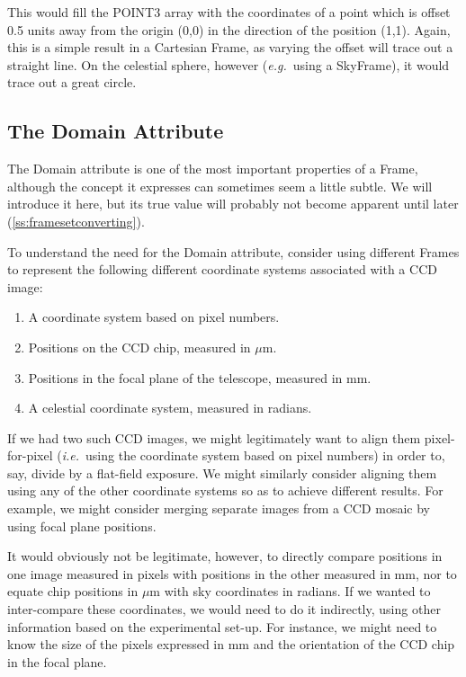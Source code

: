 \documentclass[twoside,11pt]{article}
\newcommand{\htmlref}[2]{#1}
\newcommand{\secref}[1]{\S\ref{#1}}
\renewcommand{\secref}[1]{\ref{#1}}
\begin{document}
This would fill the POINT3 array with the coordinates of a point which
is offset 0.5 units away from the origin (0,0) in the direction of the
position (1,1). Again, this is a simple result in a Cartesian Frame,
as varying the offset will trace out a straight line. On the celestial
sphere, however ({\em{e.g.}}\ using a SkyFrame), it would trace out a
great circle.

\subsection{\label{ss:framedomains}The Domain Attribute}

The \htmlref{Domain}{Domain} attribute is one of the most important properties of a
\htmlref{Frame}{Frame}, although the concept it expresses can sometimes seem a little
subtle.  We will introduce it here, but its true value will probably
not become apparent until later (\secref{ss:framesetconverting}).

To understand the need for the Domain attribute, consider using
different Frames to represent the following different coordinate
systems associated with a CCD image:

\begin{enumerate}
\item A coordinate system based on pixel numbers.

\item Positions on the CCD chip, measured in $\mu$m.

\item Positions in the focal plane of the telescope, measured in mm.

\item A celestial coordinate system, measured in radians.
\end{enumerate}

If we had two such CCD images, we might legitimately want to align
them pixel-for-pixel ({\em{i.e.}}\ using the coordinate system based
on pixel numbers) in order to, say, divide by a flat-field exposure.
We might similarly consider aligning them using any of the other
coordinate systems so as to achieve different results. For example, we
might consider merging separate images from a CCD mosaic by using
focal plane positions.

It would obviously not be legitimate, however, to directly compare
positions in one image measured in pixels with positions in the other
measured in mm, nor to equate chip positions in $\mu$m with sky
coordinates in radians. If we wanted to inter-compare these
coordinates, we would need to do it indirectly, using other
information based on the experimental set-up. For instance, we might
need to know the size of the pixels expressed in mm and the
orientation of the CCD chip in the focal plane.
\end{document}
